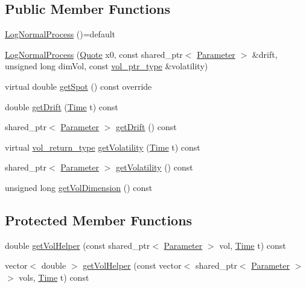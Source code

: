 \subsection*{Public Member Functions}
\begin{DoxyCompactItemize}
\item 
\hyperlink{class_log_normal_process_acf4b8a29784c43d8c613d9707492179c}{Log\+Normal\+Process} ()=default
\item 
\hyperlink{class_log_normal_process_a1320686151d44d334be1289d21f1c711}{Log\+Normal\+Process} (\hyperlink{_name_def_8h_a642a6c5fd87319d922637de0e0bb0305}{Quote} x0, const shared\+\_\+ptr$<$ \hyperlink{class_parameter}{Parameter} $>$ \&drift, unsigned long dim\+Vol, const \hyperlink{class_log_normal_process_a904926553c5e4d60e52caf87e1745651}{vol\+\_\+ptr\+\_\+type} \&volatility)
\item 
virtual double \hyperlink{class_log_normal_process_a2c01b829c59e9b6156f0e34b3632c800}{get\+Spot} () const override
\item 
double \hyperlink{class_log_normal_process_a629e2612ff67a957accb04e5fe0ad2a9}{get\+Drift} (\hyperlink{_name_def_8h_ac2d3e0ba793497bcca555c7c2cf64ff3}{Time} t) const
\item 
shared\+\_\+ptr$<$ \hyperlink{class_parameter}{Parameter} $>$ \hyperlink{class_log_normal_process_a474db0a26169f742a61cb187347151ec}{get\+Drift} () const
\item 
virtual \hyperlink{class_log_normal_process_a160d9cd152962a42ac9fc016d0948c1c}{vol\+\_\+return\+\_\+type} \hyperlink{class_log_normal_process_af2d153f75cd5efbeaa3a9028585dd835}{get\+Volatility} (\hyperlink{_name_def_8h_ac2d3e0ba793497bcca555c7c2cf64ff3}{Time} t) const
\item 
shared\+\_\+ptr$<$ \hyperlink{class_parameter}{Parameter} $>$ \hyperlink{class_log_normal_process_a7860abf96c754c037531680cb0dde6ff}{get\+Volatility} () const
\item 
unsigned long \hyperlink{class_log_normal_process_a708854438eccd5ed5d1a996c5f0b6ff8}{get\+Vol\+Dimension} () const
\end{DoxyCompactItemize}
\subsection*{Protected Member Functions}
\begin{DoxyCompactItemize}
\item 
double \hyperlink{class_log_normal_process_a547e799140c1575cc979416f3cf7ab24}{get\+Vol\+Helper} (const shared\+\_\+ptr$<$ \hyperlink{class_parameter}{Parameter} $>$ vol, \hyperlink{_name_def_8h_ac2d3e0ba793497bcca555c7c2cf64ff3}{Time} t) const
\item 
vector$<$ double $>$ \hyperlink{class_log_normal_process_aa65ab0e1f6b6679f49e993dfd1d3e9a0}{get\+Vol\+Helper} (const vector$<$ shared\+\_\+ptr$<$ \hyperlink{class_parameter}{Parameter} $>$$>$ vols, \hyperlink{_name_def_8h_ac2d3e0ba793497bcca555c7c2cf64ff3}{Time} t) const
\end{DoxyCompactItemize}
